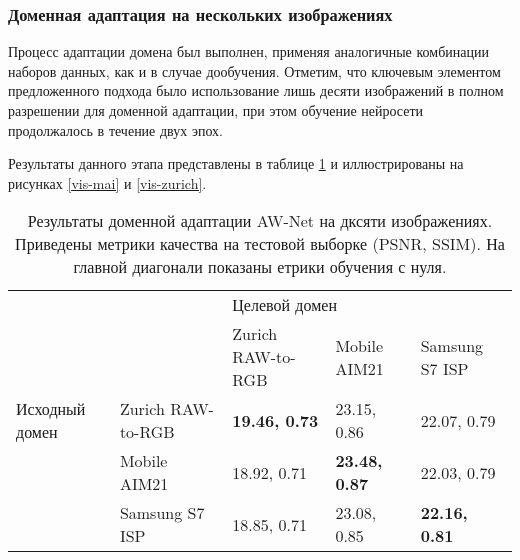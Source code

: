 \subsubsection{Доменная адаптация на нескольких изображениях}


Процесс адаптации домена был выполнен, применяя аналогичные комбинации наборов данных, как и в случае дообучения. Отметим, что ключевым элементом предложенного подхода было использование лишь десяти изображений в полном разрешении для доменной адаптации, при этом обучение нейросети продолжалось в течение двух эпох.

Результаты данного этапа представлены в таблице \ref{tab:da} и иллюстрированы на рисунках \ref{vis-mai} и \ref{vis-zurich}. 

\begin{table}[H]
    \caption{Результаты доменной адаптации AW-Net на дксяти изображениях. Приведены метрики качества на тестовой выборке (PSNR, SSIM). На главной диагонали показаны етрики обучения с нуля.}\label{tab:da}
    \begin{tabular}{|p{3cm}p{3cm}|p{3cm}p{3cm}p{3cm}|}
        \hline
        \multicolumn{2}{|p{3cm}|}{\multirow{2}{*}{}}                     & \multicolumn{3}{p{5cm}|}{Целевой домен}                                                                          \\ \cline{3-5} 
        \multicolumn{2}{|p{3cm}|}{}                                      & \multicolumn{1}{p{3cm}|}{Zurich RAW-to-RGB}  & \multicolumn{1}{p{3cm}|}{Mobile AIM21}       & Samsung S7 ISP     \\ \hline
        \multicolumn{1}{|p{3cm}|}{Исходный домен}    & Zurich RAW-to-RGB & \multicolumn{1}{p{3cm}|}{\textbf{19.46, 0.73}} & \multicolumn{1}{p{3cm}|}{23.15, 0.86}        & 22.07, 0.79        \\ \cline{2-5} 
        \multicolumn{1}{|p{3cm}|}{}                  & Mobile AIM21      & \multicolumn{1}{p{3cm}|}{18.92, 0.71}        & \multicolumn{1}{p{3cm}|}{\textbf{23.48, 0.87}} & 22.03, 0.79        \\ \cline{2-5} 
        \multicolumn{1}{|p{3cm}|}{}                  & Samsung S7 ISP    & \multicolumn{1}{p{3cm}|}{18.85, 0.71}        & \multicolumn{1}{p{3cm}|}{23.08, 0.85}        & \textbf{22.16, 0.81} \\ \hline
        \end{tabular}
\end{table}

